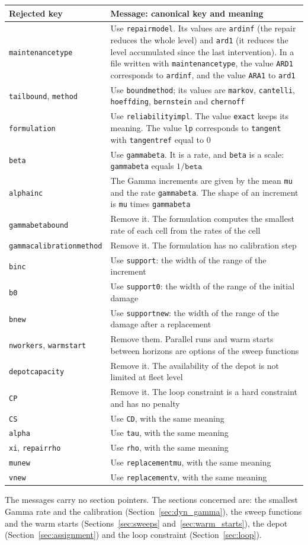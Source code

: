 \documentclass[11pt,a4paper]{article}
\makeatletter
\theoremstyle{plain}
\theoremstyle{definition}
\renewcommand{\_}{\textunderscore\allowbreak{}}
\providecommand{\rejrow}[2]{{\raggedright #1\par} & {\raggedright #2\par} \\}
\providecommand{\tabstart}[2]{\begingroup\small\begin{longtable}{@{}#1@{}}\toprule #2 \\ \midrule \endhead}
\providecommand{\tabend}{\bottomrule\end{longtable}\endgroup}
\makeatother
\begin{document}
\tabstart{p{3.3cm}p{11.0cm}}{Rejected key & Message: canonical key and meaning}
\rejrow{\texttt{maintenance\_type}}{Use \texttt{repair\_model}. Its values are \texttt{ardinf} (the repair reduces the whole level) and \texttt{ard1} (it reduces the level accumulated since the last intervention). In a file written with \texttt{maintenance\_type}, the value \texttt{ARD1} corresponds to \texttt{ardinf}, and the value \texttt{ARA1} to \texttt{ard1}}
\rejrow{\texttt{tail\_bound}, \texttt{method}}{Use \texttt{bound\_method}; its values are \texttt{markov}, \texttt{cantelli}, \texttt{hoeffding}, \texttt{bernstein} and \texttt{chernoff}}
\rejrow{\texttt{formulation}}{Use \texttt{reliability\_impl}. The value \texttt{exact} keeps its meaning. The value \texttt{lp} corresponds to \texttt{tangent} with \texttt{tangent\_ref} equal to $0$}
\rejrow{\texttt{beta}}{Use \texttt{gamma\_beta}. It is a rate, and \texttt{beta} is a scale: \texttt{gamma\_beta} equals $1/\texttt{beta}$}
\rejrow{\texttt{alpha\_inc}}{The Gamma increments are given by the mean \texttt{mu} and the rate \texttt{gamma\_beta}. The shape of an increment is \texttt{mu} times \texttt{gamma\_beta}}
\rejrow{\texttt{gamma\_beta\_bound}}{Remove it. The formulation computes the smallest rate of each cell from the rates of the cell}
\rejrow{\texttt{gamma\_calibration\_method}}{Remove it. The formulation has no calibration step}
\rejrow{\texttt{b\_inc}}{Use \texttt{support}: the width of the range of the increment}
\rejrow{\texttt{b\_0}}{Use \texttt{support\_0}: the width of the range of the initial damage}
\rejrow{\texttt{b\_new}}{Use \texttt{support\_new}: the width of the range of the damage after a replacement}
\rejrow{\texttt{n\_workers}, \texttt{warm\_start}}{Remove them. Parallel runs and warm starts between horizons are options of the sweep functions}
\rejrow{\texttt{depot\_capacity}}{Remove it. The availability of the depot is not limited at fleet level}
\rejrow{\texttt{C\_P}}{Remove it. The loop constraint is a hard constraint and has no penalty}
\rejrow{\texttt{C\_S}}{Use \texttt{C\_D}, with the same meaning}
\rejrow{\texttt{alpha}}{Use \texttt{tau}, with the same meaning}
\rejrow{\texttt{xi}, \texttt{repair\_rho}}{Use \texttt{rho}, with the same meaning}
\rejrow{\texttt{mu\_new}}{Use \texttt{replacement\_mu}, with the same meaning}
\rejrow{\texttt{v\_new}}{Use \texttt{replacement\_v}, with the same meaning}
\tabend

The messages carry no section pointers.
The sections concerned are: the smallest Gamma rate and the calibration (Section~\ref{sec:dyn_gamma}), the sweep functions and the warm starts (Sections~\ref{sec:sweeps} and~\ref{sec:warm_starts}), the depot (Section~\ref{sec:assignment}) and the loop constraint (Section~\ref{sec:loop}).
\end{document}
